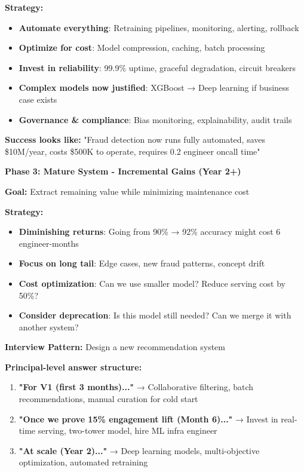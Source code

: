 \documentclass[10pt]{article}
\begin{document}
\textbf{Strategy:}
\begin{itemize}
\item \textbf{Automate everything}: Retraining pipelines, monitoring, alerting, rollback
\item \textbf{Optimize for cost}: Model compression, caching, batch processing
\item \textbf{Invest in reliability}: 99.9\% uptime, graceful degradation, circuit breakers
\item \textbf{Complex models now justified}: XGBoost → Deep learning if business case exists
\item \textbf{Governance \& compliance}: Bias monitoring, explainability, audit trails
\end{itemize}

\textbf{Success looks like:} "Fraud detection now runs fully automated, saves \$10M/year, costs \$500K to operate, requires 0.2 engineer oncall time"

\textbf{Phase 3: Mature System - Incremental Gains (Year 2+)}

\textbf{Goal:} Extract remaining value while minimizing maintenance cost

\textbf{Strategy:}
\begin{itemize}
\item \textbf{Diminishing returns}: Going from 90\% → 92\% accuracy might cost 6 engineer-months
\item \textbf{Focus on long tail}: Edge cases, new fraud patterns, concept drift
\item \textbf{Cost optimization}: Can we use smaller model? Reduce serving cost by 50\%?
\item \textbf{Consider deprecation}: Is this model still needed? Can we merge it with another system?
\end{itemize}

\textbf{Interview Pattern:} Design a new recommendation system

\textbf{Principal-level answer structure:}
\begin{enumerate}
\item \textbf{"For V1 (first 3 months)..."} → Collaborative filtering, batch recommendations, manual curation for cold start
\item \textbf{"Once we prove 15\% engagement lift (Month 6)..."} → Invest in real-time serving, two-tower model, hire ML infra engineer
\item \textbf{"At scale (Year 2)..."} → Deep learning models, multi-objective optimization, automated retraining
\end{enumerate}
\end{document}

